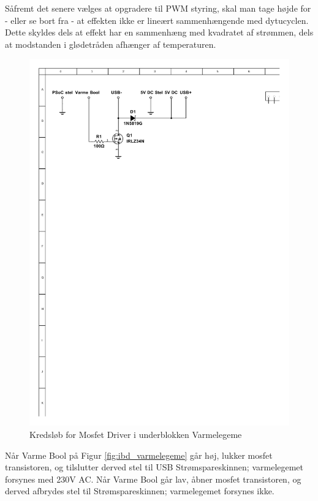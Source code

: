 Såfremt det senere vælges at opgradere til PWM styring, skal man tage højde for - eller se bort fra - at effekten ikke er lineært sammenhængende med dytucyclen. Dette skyldes dels at effekt har en sammenhæng med kvadratet af strømmen, dels at modstanden i glødetråden afhænger af temperaturen. 

\clearpage

\begin{figure}[h]
\centering 
\includegraphics[width={\textwidth-5cm}, trim= 50 610 220 70, clip=true] {../fig/multisim_varmelegeme_mosfetdriver.pdf}
\caption{Kredsløb for Mosfet Driver i underblokken Varmelegeme}
\label{fig:multisim_varmelegeme_mosfetdriver}
\end{figure}

Når Varme Bool på Figur \ref{fig:ibd_varmelegeme} går høj, lukker mosfet transistoren, og tilslutter derved stel til USB Strømspareskinnen; varmelegemet forsynes med 230V AC. 
Når Varme Bool går lav, åbner mosfet transistoren, og derved afbrydes stel til Strømspareskinnen; varmelegemet forsynes ikke.  

